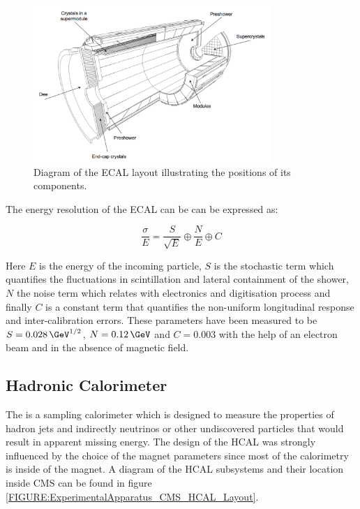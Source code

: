 \begin{figure}[!htb]
  \centering
  \includegraphics[width=0.8\textwidth]{Chapter02/CMS/Images/CMS_ECAL_Layout.png}
  \caption{Diagram of the ECAL layout illustrating the positions of its components.}
  \label{FIGURE:ExperimentalApparatus_CMS_ECAL_Layout}
\end{figure}
 
The energy resolution of the \gls{ECAL} can be can be expressed as: 

\begin{equation}
\frac{\sigma}{E} = \frac{S}{\sqrt{E}} \oplus \frac{N}{E} \oplus C
\end{equation}

Here $E$ is the energy of the incoming particle, $S$ is the stochastic term which quantifies the fluctuations in scintillation and lateral containment of the shower, $N$ the noise term which relates with electronics and digitisation process and finally $C$ is a constant term that quantifies the non-uniform longitudinal response and inter-calibration errors. These parameters have been measured to be  $S=0.028\,\GeV^{1/2}$, $N=0.12\,\GeV$ and $C=0.003$ with the help of an electron beam\cite{ARTICLE:CMSECALTestBeam} and in the absence of magnetic field.

\subsection{Hadronic Calorimeter}
\label{SUBSECTION:ExperimentalApparatus_CMS_HCAL}


The  is a sampling calorimeter which is designed to measure the properties of hadron jets and indirectly neutrinos or other undiscovered particles that would result in apparent missing energy\cite{ARTICLE:CMSTechnicalProposal}. The design of the \gls{HCAL} was strongly influenced by the choice of the magnet parameters since most of the calorimetry is inside of the magnet. A diagram of the \gls{HCAL} subsystems and their location inside \gls{CMS} can be found in figure \ref{FIGURE:ExperimentalApparatus_CMS_HCAL_Layout}.

